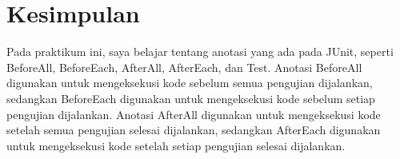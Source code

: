 \documentclass[a4paper,oneside,11pt]{book}
\begin{document}
\chapter{Kesimpulan}
Pada praktikum ini, saya belajar tentang anotasi yang ada pada JUnit, seperti BeforeAll, BeforeEach, AfterAll, AfterEach, dan Test. Anotasi BeforeAll digunakan untuk mengeksekusi kode sebelum semua pengujian dijalankan, sedangkan BeforeEach digunakan untuk mengeksekusi kode sebelum setiap pengujian dijalankan. Anotasi AfterAll digunakan untuk mengeksekusi kode setelah semua pengujian selesai dijalankan, sedangkan AfterEach digunakan untuk mengeksekusi kode setelah setiap pengujian selesai dijalankan.
\end{document}

